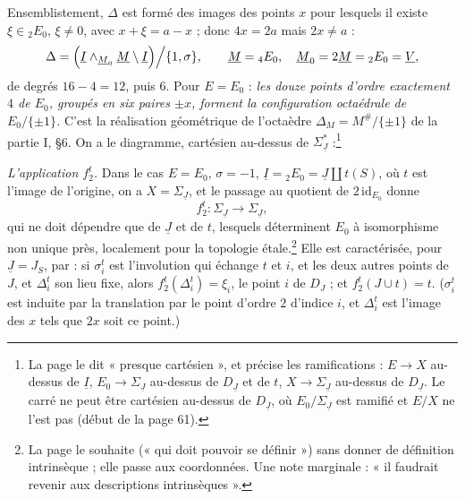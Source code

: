 \documentclass[11pt,a4paper]{article}
\begin{document}
Ensemblistement, $\Delta$ est formé des images des points $x$ pour lesquels il
existe $\xi \in {}_2E_0$, $\xi \neq 0$, avec $x + \xi = a - x$ ; donc $4x = 2a$
mais $2x \neq a$ :
\[
\Delta = \Bigl( \underline{I} \wedge_{\underline{M}_0} \underline{M} \setminus
\underline{I} \Bigr) \Big/ \{1, \sigma\}, \qquad \underline{M} = {}_4E_0, \quad
\underline{M}_0 = 2\underline{M} = {}_2E_0 = \underline{V},
\]
de degrés $16 - 4 = 12$, puis $6$. Pour $E = E_0$ : \emph{les douze points
d'ordre exactement $4$ de $E_0$, groupés en six paires $\pm x$, forment la
configuration octaédrale de $E_0/\{\pm 1\}$.} C'est la réalisation géométrique
de l'octaèdre $\Delta_M = M^{\#}/\{\pm 1\}$ de la partie I, §6. On a le
diagramme, cartésien au-dessus de $\Sigma^{*}_{\underline{J}}$ :\footnote{La
page le dit « presque cartésien », et précise les ramifications : $E \to X$
au-dessus de $\underline{I}$, $E_0 \to \Sigma_{\underline{J}}$ au-dessus de
$D_{\underline{J}}$ et de $t$, $X \to \Sigma_{\underline{J}}$ au-dessus de
$D_{\underline{J}}$. Le carré ne peut être cartésien au-dessus de
$D_{\underline{J}}$, où $E_0 / \Sigma_{\underline{J}}$ est ramifié et $E/X$ ne
l'est pas (début de la page 61).}



\emph{L'application $f^t_2$.} Dans le cas $E = E_0$, $\sigma = -1$,
$\underline{I} = {}_2E_0 = \underline{J} \amalg t(S)$, où $t$ est l'image de
l'origine, on a $X = \Sigma_{\underline{J}}$, et le passage au quotient de
$2\,\mathrm{id}_{E_0}$ donne
\[
f^t_2 : \Sigma_{\underline{J}} \longrightarrow \Sigma_{\underline{J}},
\]
qui ne doit dépendre que de $\underline{J}$ et de $t$, lesquels déterminent
$E_0$ à isomorphisme non unique près, localement pour la topologie
étale.\footnote{La page le souhaite (« qui doit pouvoir se définir ») sans
donner de définition intrinsèque ; elle passe aux coordonnées. Une note
marginale : « il faudrait revenir aux descriptions intrinsèques ».} Elle est
caractérisée, pour $\underline{J} = J_S$, par : si $\sigma_i^t$ est
l'involution qui échange $t$ et $i$, et les deux autres points de $J$, et
$\Delta^t_i$ son lieu fixe, alors $f^t_2(\Delta^t_i) = \xi_i$, le point $i$ de
$D_J$ ; et $f^t_2(J \cup t) = t$. ($\sigma^t_i$ est induite par la translation
par le point d'ordre $2$ d'indice $i$, et $\Delta^t_i$ est l'image des $x$ tels
que $2x$ soit ce point.)
\end{document}
